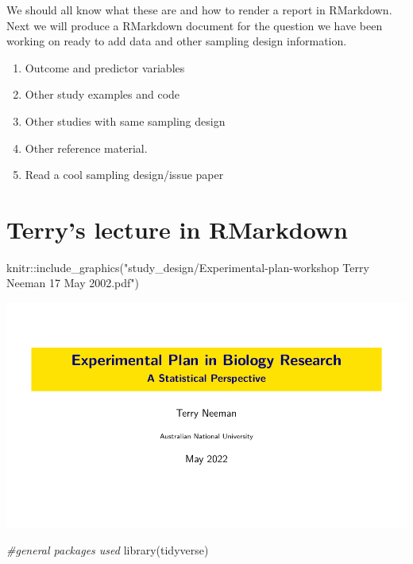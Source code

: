 \documentclass[
]{book}
\newenvironment{Shaded}{\begin{snugshade}}{\end{snugshade}}
\newcommand{\CommentTok}[1]{\textcolor[rgb]{0.56,0.35,0.01}{\textit{#1}}}
\newcommand{\FunctionTok}[1]{\textcolor[rgb]{0.00,0.00,0.00}{#1}}
\newcommand{\NormalTok}[1]{#1}
\newcommand{\SpecialCharTok}[1]{\textcolor[rgb]{0.00,0.00,0.00}{#1}}
\newcommand{\StringTok}[1]{\textcolor[rgb]{0.31,0.60,0.02}{#1}}
\providecommand{\tightlist}{%
  \setlength{\itemsep}{0pt}\setlength{\parskip}{0pt}}
\begin{document}
We should all know what these are and how to render a report in RMarkdown. Next we will produce a RMarkdown document for the question we have been working on ready to add data and other sampling design information.

\begin{enumerate}
\def\labelenumi{\arabic{enumi}.}
\tightlist
\item
  Outcome and predictor variables
\item
  Other study examples and code
\item
  Other studies with same sampling design
\item
  Other reference material.
\item
  Read a cool sampling design/issue paper
\end{enumerate}

\hypertarget{terrys-lecture-in-rmarkdown}{%
\section{Terry's lecture in RMarkdown}\label{terrys-lecture-in-rmarkdown}}

\begin{Shaded}
\begin{Highlighting}[]
\NormalTok{knitr}\SpecialCharTok{::}\FunctionTok{include\_graphics}\NormalTok{(}\StringTok{"study\_design/Experimental{-}plan{-}workshop Terry Neeman 17 May 2002.pdf"}\NormalTok{)}
\end{Highlighting}
\end{Shaded}

\includegraphics{study_design/Experimental-plan-workshop Terry Neeman 17 May 2002.pdf}

\begin{Shaded}
\begin{Highlighting}[]
\CommentTok{\#general packages used}
\FunctionTok{library}\NormalTok{(tidyverse)}
\end{Highlighting}
\end{Shaded}
\end{document}
